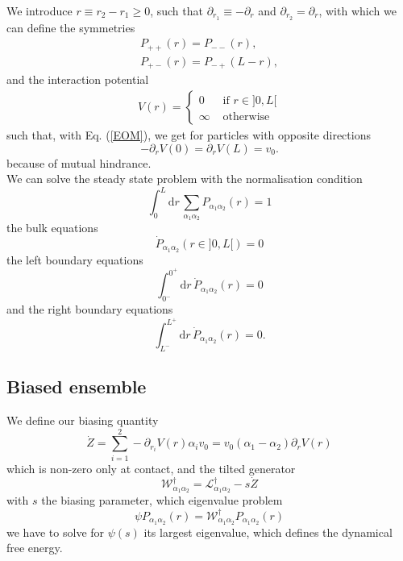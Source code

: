 \documentclass[pre,aps,superscriptaddress,nofootinbib]{revtex4}
\begin{document}
We introduce $r \equiv r_2 - r_1 \geq 0$, such that $\partial_{r_1} \equiv - \partial_r$ and $\partial_{r_2} = \partial_r$, with which we can define the symmetries
\begin{eqnarray}
\label{evensymmetry}
P_{++}(r) = P_{--}(r),\\
\label{oddsymmetry}
P_{+-}(r) = P_{-+}(L - r),
\end{eqnarray}
and the interaction potential
\begin{align*}
V(r) = \begin{cases} 0 &\text{ if } r \in ]0, L[ \\ \infty &\text{ otherwise} \end{cases}
\end{align*}
such that, with Eq. (\ref{EOM}), we get for particles with opposite directions
\begin{equation}
- \partial_r V(0) = \partial_r V(L) = v_0.
\end{equation}
because of mutual hindrance.\\

We can solve the steady state problem with the normalisation condition
\begin{equation}
\int_0^L \mathrm{d}r \, \sum_{\alpha_1\alpha_2} P_{\alpha_1\alpha_2}(r) = 1
\label{normalisation}
\end{equation}
the bulk equations
\begin{equation}
\dot{P}_{\alpha_1\alpha_2}(r \in ]0, L[) = 0
\label{bulk}
\end{equation}
the left boundary equations
\begin{equation}
\int_{0^-}^{0^+} \mathrm{d}r \, \dot{P}_{\alpha_1\alpha_2}(r) = 0
\label{leftboundary}
\end{equation}
and the right boundary equations
\begin{equation}
\int_{L^-}^{L^+} \mathrm{d}r \, \dot{P}_{\alpha_1\alpha_2}(r) = 0.
\label{rightboundary}
\end{equation}

\subsection{Biased ensemble}

We define our biasing quantity
\begin{equation}
\dot{Z} = \sum_{i=1}^2 - \partial_{r_i} V(r) \alpha_i v_0 = v_0 (\alpha_1 - \alpha_2) \partial_r V(r)
\end{equation}
which is non-zero only at contact, and the tilted generator
\begin{equation}
\mathcal{W}^{\dagger}_{\alpha_1\alpha_2} = \mathcal{L}^{\dagger}_{\alpha_1\alpha_2} - s \dot{Z}
\end{equation}
with $s$ the biasing parameter, which eigenvalue problem
\begin{equation}
\psi P_{\alpha_1\alpha_2}(r) = \mathcal{W}^{\dagger}_{\alpha_1\alpha_2} P_{\alpha_1\alpha_2}(r)
\label{eigenproblem}
\end{equation}
we have to solve for $\psi(s)$ its largest eigenvalue, which defines the dynamical free energy.\\
\end{document}
